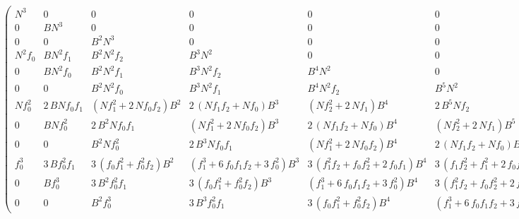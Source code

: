 \documentclass{standalone}
\begin{document}
$\left(\begin{array}{rrrrrrrrrrrr}
N^{3} & 0 & 0 & 0 & 0 & 0 & 0 & 0 & 0 & 0 & 0 & 0 \\
0 & B N^{3} & 0 & 0 & 0 & 0 & 0 & 0 & 0 & 0 & 0 & 0 \\
0 & 0 & B^{2} N^{3} & 0 & 0 & 0 & 0 & 0 & 0 & 0 & 0 & 0 \\
N^{2} f_{0} & B N^{2} f_{1} & B^{2} N^{2} f_{2} & B^{3} N^{2} & 0 & 0 & 0 & 0 & 0 & 0 & 0 & 0 \\
0 & B N^{2} f_{0} & B^{2} N^{2} f_{1} & B^{3} N^{2} f_{2} & B^{4} N^{2} & 0 & 0 & 0 & 0 & 0 & 0 & 0 \\
0 & 0 & B^{2} N^{2} f_{0} & B^{3} N^{2} f_{1} & B^{4} N^{2} f_{2} & B^{5} N^{2} & 0 & 0 & 0 & 0 & 0 & 0 \\
N f_{0}^{2} & 2 \, B N f_{0} f_{1} & {\left(N f_{1}^{2} + 2 \, N f_{0} f_{2}\right)} B^{2} & 2 \, {\left(N f_{1} f_{2} + N f_{0}\right)} B^{3} & {\left(N f_{2}^{2} + 2 \, N f_{1}\right)} B^{4} & 2 \, B^{5} N f_{2} & B^{6} N & 0 & 0 & 0 & 0 & 0 \\
0 & B N f_{0}^{2} & 2 \, B^{2} N f_{0} f_{1} & {\left(N f_{1}^{2} + 2 \, N f_{0} f_{2}\right)} B^{3} & 2 \, {\left(N f_{1} f_{2} + N f_{0}\right)} B^{4} & {\left(N f_{2}^{2} + 2 \, N f_{1}\right)} B^{5} & 2 \, B^{6} N f_{2} & B^{7} N & 0 & 0 & 0 & 0 \\
0 & 0 & B^{2} N f_{0}^{2} & 2 \, B^{3} N f_{0} f_{1} & {\left(N f_{1}^{2} + 2 \, N f_{0} f_{2}\right)} B^{4} & 2 \, {\left(N f_{1} f_{2} + N f_{0}\right)} B^{5} & {\left(N f_{2}^{2} + 2 \, N f_{1}\right)} B^{6} & 2 \, B^{7} N f_{2} & B^{8} N & 0 & 0 & 0 \\
f_{0}^{3} & 3 \, B f_{0}^{2} f_{1} & 3 \, {\left(f_{0} f_{1}^{2} + f_{0}^{2} f_{2}\right)} B^{2} & {\left(f_{1}^{3} + 6 \, f_{0} f_{1} f_{2} + 3 \, f_{0}^{2}\right)} B^{3} & 3 \, {\left(f_{1}^{2} f_{2} + f_{0} f_{2}^{2} + 2 \, f_{0} f_{1}\right)} B^{4} & 3 \, {\left(f_{1} f_{2}^{2} + f_{1}^{2} + 2 \, f_{0} f_{2}\right)} B^{5} & {\left(f_{2}^{3} + 6 \, f_{1} f_{2} + 3 \, f_{0}\right)} B^{6} & 3 \, {\left(f_{2}^{2} + f_{1}\right)} B^{7} & 3 \, B^{8} f_{2} & B^{9} & 0 & 0 \\
0 & B f_{0}^{3} & 3 \, B^{2} f_{0}^{2} f_{1} & 3 \, {\left(f_{0} f_{1}^{2} + f_{0}^{2} f_{2}\right)} B^{3} & {\left(f_{1}^{3} + 6 \, f_{0} f_{1} f_{2} + 3 \, f_{0}^{2}\right)} B^{4} & 3 \, {\left(f_{1}^{2} f_{2} + f_{0} f_{2}^{2} + 2 \, f_{0} f_{1}\right)} B^{5} & 3 \, {\left(f_{1} f_{2}^{2} + f_{1}^{2} + 2 \, f_{0} f_{2}\right)} B^{6} & {\left(f_{2}^{3} + 6 \, f_{1} f_{2} + 3 \, f_{0}\right)} B^{7} & 3 \, {\left(f_{2}^{2} + f_{1}\right)} B^{8} & 3 \, B^{9} f_{2} & B^{10} & 0 \\
0 & 0 & B^{2} f_{0}^{3} & 3 \, B^{3} f_{0}^{2} f_{1} & 3 \, {\left(f_{0} f_{1}^{2} + f_{0}^{2} f_{2}\right)} B^{4} & {\left(f_{1}^{3} + 6 \, f_{0} f_{1} f_{2} + 3 \, f_{0}^{2}\right)} B^{5} & 3 \, {\left(f_{1}^{2} f_{2} + f_{0} f_{2}^{2} + 2 \, f_{0} f_{1}\right)} B^{6} & 3 \, {\left(f_{1} f_{2}^{2} + f_{1}^{2} + 2 \, f_{0} f_{2}\right)} B^{7} & {\left(f_{2}^{3} + 6 \, f_{1} f_{2} + 3 \, f_{0}\right)} B^{8} & 3 \, {\left(f_{2}^{2} + f_{1}\right)} B^{9} & 3 \, B^{10} f_{2} & B^{11}
\end{array}\right)$
\end{document}
